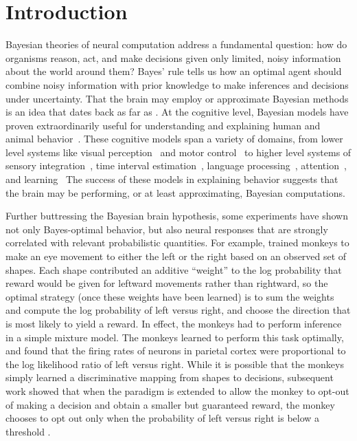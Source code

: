 \section{Introduction}
Bayesian theories of neural computation address a fundamental
question: how do organisms reason, act, and make decisions given only
limited, noisy information about the world around them?  Bayes' rule
tells us how an optimal agent should combine noisy information with
prior knowledge to make inferences and decisions under uncertainty.
That the brain may employ or approximate Bayesian methods is an idea
that dates back as far as \citet{helmholtz1925treatise}.  At the
cognitive level, Bayesian models have proven extraordinarily useful
for understanding and explaining human and animal
behavior~\cite{tenenbaum2011grow, griffiths2008bayesian}. These
cognitive models span a variety of domains, from lower level systems
like visual perception~\cite{knill1996perception,
  brainard1997bayesian, weiss2002motion, yuille2006vision,
  Stocker2006, Simoncelli2009} and motor control~\cite{Kording2004} to
higher level systems of sensory integration~\cite{ernst2002humans},
time interval estimation~\cite{jazayeri2010temporal}, 
language processing~\cite{chater2006probabilistic},
attention~\cite{whiteley2012attention, chikkerur2010,
  dayan2010selective}, and learning~\cite{tenenbaum2006theory,
  courville2006bayesian} The success of these models in explaining
behavior suggests that the brain may be performing, or at least
approximating, Bayesian computations.

Further buttressing the Bayesian brain hypothesis, some experiments
have shown not only Bayes-optimal behavior, but also neural responses
that are strongly correlated with relevant probabilistic quantities.
For example, \citet{Yang2007} trained monkeys to make an eye movement
to either the left or the right based on an observed set of shapes.
Each shape contributed an additive ``weight'' to the log probability
that reward would be given for leftward movements rather than
rightward, so the optimal strategy (once these weights have been
learned) is to sum the weights and compute the log probability of left
versus right, and choose the direction that is most likely to yield a
reward.  In effect, the monkeys had to perform inference in a simple
mixture model. The monkeys learned to perform this task optimally, and
\citet{Yang2007} found that the firing rates of neurons in parietal
cortex were proportional to the log likelihood ratio of left versus
right. While it is possible that the monkeys simply learned a
discriminative mapping from shapes to decisions, subsequent work
showed that when the paradigm is extended to allow the monkey to
opt-out of making a decision and obtain a smaller but guaranteed
reward, the monkey chooses to opt out only when the probability of
left versus right is below a threshold \cite{Kiani2009}.

